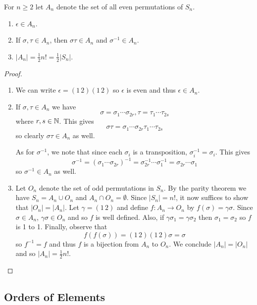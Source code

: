 \documentclass[11pt]{article}
\begin{document}
\begin{proposition}
    For $n\geq2$ let $A_n$ denote the set of all even permutations of $S_n$.
    \begin{enumerate}
        \item $\epsilon\in A_n$.
        \item If $\sigma,\tau\in A_n$, then $\sigma\tau\in A_n$ and $\sigma^{-1}\in A_n$.
        \item $|A_n|=\frac{1}{2}n!=\frac{1}{2}|S_n|$.
    \end{enumerate}
\end{proposition}

\begin{proof}\,
\begin{enumerate}
    \item We can write $\epsilon=(1\,2)(1\,2)$ so $\epsilon$ is even and thus $\epsilon\in A_n$.
    \item If $\sigma,\tau\in A_n$ we have
    \[\sigma=\sigma_1\cdots\sigma_{2r},\tau=\tau_1\cdots\tau_{2s}\]
    where $r,s\in\mathbb{N}$. This gives
    \[\sigma\tau=\sigma_1\cdots\sigma_{2r}\tau_1\cdots\tau_{2s}\]
    so clearly $\sigma\tau\in A_n$ as well.

    As for $\sigma^{-1}$, we note that since each $\sigma_i$ is a transposition, $\sigma_i^{-1}=\sigma_i$. This gives
    \[\sigma^{-1}=(\sigma_1\cdots\sigma_{2r})^{-1}=\sigma_{2r}^{-1}\cdots\sigma_1^{-1}=\sigma_{2r}\cdots\sigma_1\]
    so $\sigma^{-1}\in A_n$ as well.
    \item Let $O_n$ denote the set of odd permutations in $S_n$. By the parity theorem we have $S_n=A_n\cup O_n$ and $A_n\cap O_n=\emptyset$. Since $|S_n|=n!$, it now suffices to show that $|O_n|=|A_n|$. Let $\gamma=(1\,2)$ and define $f:A_n\to O_n$ by $f(\sigma)=\gamma\sigma$. Since $\sigma\in A_n$, $\gamma\sigma\in O_n$ and so $f$ is well defined. Also, if $\gamma\sigma_1=\gamma\sigma_2$ then $\sigma_1=\sigma_2$ so $f$ is 1 to 1. Finally, observe that
    \[f(f(\sigma))=(1\,2)(1\,2)\sigma=\sigma\]
    so $f^{-1}=f$ and thus $f$ is a bijection from $A_n$ to $O_n$. We conclude $|A_n|=|O_n|$ and so $|A_n|=\frac{1}{2}n!$.
\end{enumerate}
\end{proof}

\subsection{Orders of Elements}
\end{document}
